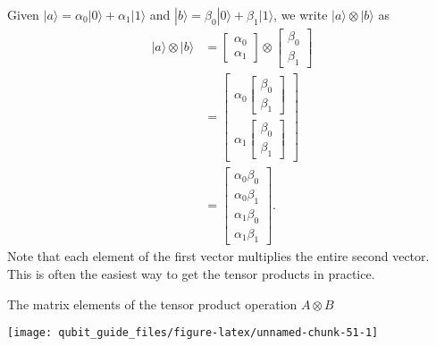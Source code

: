 \documentclass[fleqn]{article}
\begin{document}
Given \(|a\rangle = \alpha_0|0\rangle + \alpha_1|1\rangle\) and \(|b\rangle = \beta_0|0\rangle +\beta_1|1\rangle\), we write \(|a\rangle\otimes|b\rangle\) as
\[
  \begin{aligned}
    |a\rangle\otimes|b\rangle
    &= \begin{bmatrix}\alpha_0\\\alpha_1\end{bmatrix} \otimes \begin{bmatrix}\beta_0\\\beta_1\end{bmatrix}
  \\&= \begin{bmatrix}\alpha_0\begin{bmatrix}\beta_0\\\beta_1\end{bmatrix}\\\alpha_1\begin{bmatrix}\beta_0\\\beta_1\end{bmatrix}\end{bmatrix}
  \\&= \begin{bmatrix}\alpha_0\beta_0\\\alpha_0\beta_1\\\alpha_1\beta_0\\\alpha_1\beta_1\end{bmatrix}.
  \end{aligned}
\]
Note that each element of the first vector multiplies the entire second vector.
This is often the easiest way to get the tensor products in practice.

The matrix elements of the tensor product operation \(A\otimes B\)

\begin{center}\texttt{[image: qubit\_guide\_files/figure-latex/unnamed-chunk-51-1]} \end{center}
\end{document}
